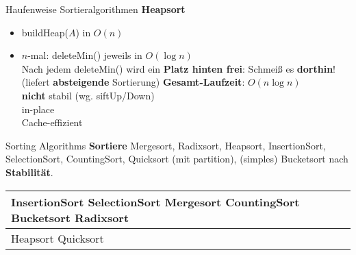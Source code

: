 \iffalse
\begin{frame}{Binäre Heaps}
	\textbf{Adressierbare Heaps} \\[0,125cm]
	\begin{itemize}
		\item Vorhaben: Ermögliche die Änderung des Wertes eines Elementes (d.h. nach der Wertänderung wird das Element an seine neue Position hoch- bzw. runtergetauscht)
		\pause
		\item Problem: Wenn Elemente ihre Position im Array (und somit im Speicher) ständig ändern, können sie nicht beständig adressiert werden
		\pause
		\item Lösung: Halte nicht die Elemente selbst, sondern Referenzen auf diese Elemente in der Datenstruktur
	\end{itemize}
\end{frame}
\fi

\begin{frame}{Haufenweise Sortieralgorithmen}
	\textbf{Heapsort} 
	\begin{itemize}
		\item buildHeap($A$) \qquad in $O(n)$ 
		\item $n$-mal: \quad deleteMin() \qquad jeweils in $O(\log n)$ \\
		\pause
		Nach jedem deleteMin() wird ein \textbf{Platz hinten frei}: Schmeiß es \textbf{dorthin}! (\impl liefert \textbf{absteigende} Sortierung)
		\visible<2->{\texttt{[image: heapsort-inplace]}}
		\pause
		\implitem \textbf{Gesamt-Laufzeit}: $O(n \log n)$ \\
		\Cons \textbf{nicht} stabil \quad (wg. siftUp/Down) \\
		\Pros in-place  \\
		\Pros Cache-effizient
	\end{itemize}
\end{frame}


\begin{frame}{Sorting Algorithms}
	\textbf{Sortiere} Mergesort, Radixsort, Heapsort, InsertionSort, SelectionSort, CountingSort, Quicksort {\small (mit partition)}, (simples) Bucketsort nach \textbf{Stabilität}. \\
	\pause
	\forcenewline
	\centering
	\begin{tabular}{m{.3\linewidth} | m{.2\linewidth} |}
		\hline
		InsertionSort \newline 
		SelectionSort \newline
		Mergesort \newline
		CountingSort \newline
		Bucketsort \newline
		Radixsort & \YesCell \\
		\hline
		Heapsort \newline
		Quicksort & \NoCell \\
		\hline
	\end{tabular}
\end{frame}

